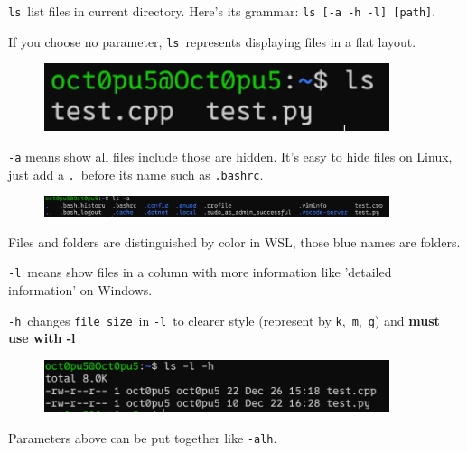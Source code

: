 \documentclass[12pt]{ctexart}
\newenvironment{mdquote}
{%
  \par\noindent
  \begin{list}{}{%
      \setlength{\leftmargin}{1em}%
      \setlength{\rightmargin}{0pt}%
      \setlength{\itemindent}{0pt}%
      \setlength{\listparindent}{\parindent}%
      \setlength{\topsep}{0.5\baselineskip}%
  }
  \item[\textbf{>}\ ]\itshape
}
{\end{list}\par}
\begin{document}
\texttt{ls}\ list files in current directory. Here's its
grammar: \texttt{ls\ {[}-a\ -h\ -l{]}\ {[}path{]}}.

If you choose no parameter, \texttt{ls}\ represents displaying files in a
flat layout.

\begin{figure}[H]
    \centering
    \includegraphics[width=0.9\textwidth,keepaspectratio]{assets/Linux/1.4 Linux directory structure and command/1.png}
\end{figure}

\texttt{-a} means show all files include those are hidden.
It's easy to hide files on Linux, just add a \texttt{.}\
before its name such as \texttt{.bashrc}.

\begin{figure}[H]
    \centering
    \includegraphics[width=0.9\textwidth,keepaspectratio]{assets/Linux/1.4 Linux directory structure and command/2.png}
\end{figure}

\begin{mdquote}
Files and folders are distinguished by color in WSL, those blue names
are folders.
\end{mdquote}

\texttt{-l}\ means show files in a column with more information like
'detailed information' on Windows.

\texttt{-h}\ changes \texttt{file\ size}\ in \texttt{-l}\ to clearer style
(represent by \texttt{k},\ \texttt{m},\ \texttt{g}) and \textbf{must use
with -l}

\begin{figure}[H]
    \centering
    \includegraphics[width=0.9\textwidth,keepaspectratio]{assets/Linux/1.4 Linux directory structure and command/3.png}
\end{figure}

\begin{mdquote}
Parameters above can be put together like \texttt{-alh}.
\end{mdquote}
\end{document}
